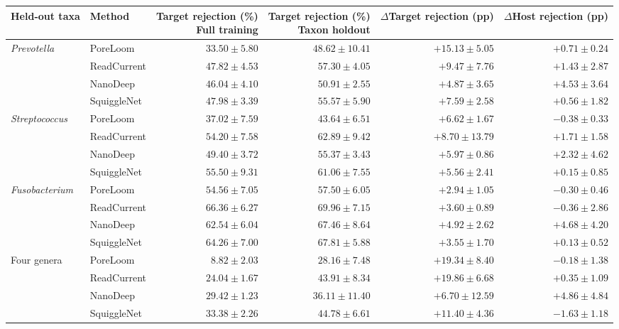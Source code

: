 \begin{tabular}{@{}llrrrr@{}}
\toprule
Held-out taxa & Method & \shortstack{Target rejection (\%)\\Full training} & \shortstack{Target rejection (\%)\\Taxon holdout} & \shortstack{$\Delta$Target rejection\\(pp)} & \shortstack{$\Delta$Host rejection\\(pp)}\\\midrule
\textit{Prevotella} & PoreLoom & $33.50 \pm 5.80$ & $48.62 \pm 10.41$ & $+15.13 \pm 5.05$ & $+0.71 \pm 0.24$\\
 & ReadCurrent & $47.82 \pm 4.53$ & $57.30 \pm 4.05$ & $+9.47 \pm 7.76$ & $+1.43 \pm 2.87$\\
 & NanoDeep & $46.04 \pm 4.10$ & $50.91 \pm 2.55$ & $+4.87 \pm 3.65$ & $+4.53 \pm 3.64$\\
 & SquiggleNet & $47.98 \pm 3.39$ & $55.57 \pm 5.90$ & $+7.59 \pm 2.58$ & $+0.56 \pm 1.82$\\
\addlinespace
\textit{Streptococcus} & PoreLoom & $37.02 \pm 7.59$ & $43.64 \pm 6.51$ & $+6.62 \pm 1.67$ & $-0.38 \pm 0.33$\\
 & ReadCurrent & $54.20 \pm 7.58$ & $62.89 \pm 9.42$ & $+8.70 \pm 13.79$ & $+1.71 \pm 1.58$\\
 & NanoDeep & $49.40 \pm 3.72$ & $55.37 \pm 3.43$ & $+5.97 \pm 0.86$ & $+2.32 \pm 4.62$\\
 & SquiggleNet & $55.50 \pm 9.31$ & $61.06 \pm 7.55$ & $+5.56 \pm 2.41$ & $+0.15 \pm 0.85$\\
\addlinespace
\textit{Fusobacterium} & PoreLoom & $54.56 \pm 7.05$ & $57.50 \pm 6.05$ & $+2.94 \pm 1.05$ & $-0.30 \pm 0.46$\\
 & ReadCurrent & $66.36 \pm 6.27$ & $69.96 \pm 7.15$ & $+3.60 \pm 0.89$ & $-0.36 \pm 2.86$\\
 & NanoDeep & $62.54 \pm 6.04$ & $67.46 \pm 8.64$ & $+4.92 \pm 2.62$ & $+4.68 \pm 4.20$\\
 & SquiggleNet & $64.26 \pm 7.00$ & $67.81 \pm 5.88$ & $+3.55 \pm 1.70$ & $+0.13 \pm 0.52$\\
\addlinespace
Four genera & PoreLoom & $8.82 \pm 2.03$ & $28.16 \pm 7.48$ & $+19.34 \pm 8.40$ & $-0.18 \pm 1.38$\\
 & ReadCurrent & $24.04 \pm 1.67$ & $43.91 \pm 8.34$ & $+19.86 \pm 6.68$ & $+0.35 \pm 1.09$\\
 & NanoDeep & $29.42 \pm 1.23$ & $36.11 \pm 11.40$ & $+6.70 \pm 12.59$ & $+4.86 \pm 4.84$\\
 & SquiggleNet & $33.38 \pm 2.26$ & $44.78 \pm 6.61$ & $+11.40 \pm 4.36$ & $-1.63 \pm 1.18$\\
\bottomrule
\end{tabular}
